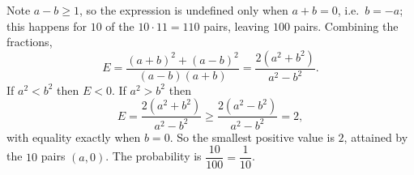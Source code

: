 Note $a-b\ge1$, so the expression is undefined only when $a+b=0$, i.e.\ $b=-a$; this happens for $10$ of the $10\cdot11=110$ pairs, leaving $100$ pairs. Combining the fractions,
\[
E=\dfrac{(a+b)^2+(a-b)^2}{(a-b)(a+b)}=\dfrac{2(a^2+b^2)}{a^2-b^2}.
\]
If $a^2<b^2$ then $E<0$. If $a^2>b^2$ then
\[
E=\dfrac{2(a^2+b^2)}{a^2-b^2}\ge\dfrac{2(a^2-b^2)}{a^2-b^2}=2,
\]
with equality exactly when $b=0$. So the smallest positive value is $2$, attained by the $10$ pairs $(a,0)$. The probability is $\dfrac{10}{100}=\boxed{\dfrac{1}{10}}$.
